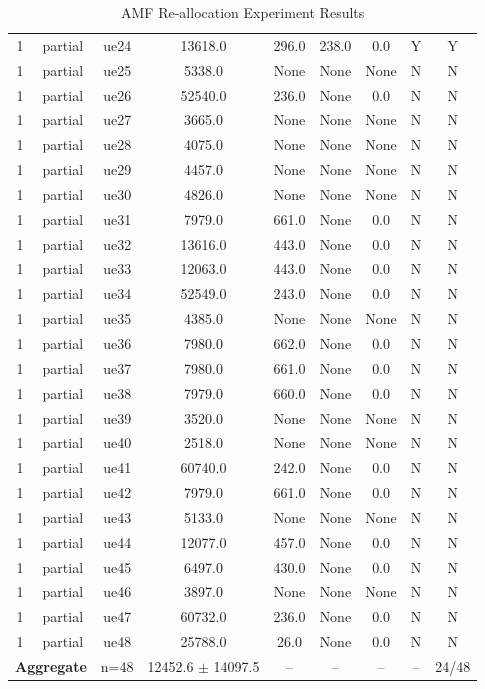 \begin{table}[ht]
\begin{tabular}{|c|c|c|c|c|c|c|c|c|}
1 & partial & ue24 & 13618.0 & 296.0 & 238.0 & 0.0 & Y & Y \\
1 & partial & ue25 & 5338.0 & None & None & None & N & N \\
1 & partial & ue26 & 52540.0 & 236.0 & None & 0.0 & N & N \\
1 & partial & ue27 & 3665.0 & None & None & None & N & N \\
1 & partial & ue28 & 4075.0 & None & None & None & N & N \\
1 & partial & ue29 & 4457.0 & None & None & None & N & N \\
1 & partial & ue30 & 4826.0 & None & None & None & N & N \\
1 & partial & ue31 & 7979.0 & 661.0 & None & 0.0 & N & N \\
1 & partial & ue32 & 13616.0 & 443.0 & None & 0.0 & N & N \\
1 & partial & ue33 & 12063.0 & 443.0 & None & 0.0 & N & N \\
1 & partial & ue34 & 52549.0 & 243.0 & None & 0.0 & N & N \\
1 & partial & ue35 & 4385.0 & None & None & None & N & N \\
1 & partial & ue36 & 7980.0 & 662.0 & None & 0.0 & N & N \\
1 & partial & ue37 & 7980.0 & 661.0 & None & 0.0 & N & N \\
1 & partial & ue38 & 7979.0 & 660.0 & None & 0.0 & N & N \\
1 & partial & ue39 & 3520.0 & None & None & None & N & N \\
1 & partial & ue40 & 2518.0 & None & None & None & N & N \\
1 & partial & ue41 & 60740.0 & 242.0 & None & 0.0 & N & N \\
1 & partial & ue42 & 7979.0 & 661.0 & None & 0.0 & N & N \\
1 & partial & ue43 & 5133.0 & None & None & None & N & N \\
1 & partial & ue44 & 12077.0 & 457.0 & None & 0.0 & N & N \\
1 & partial & ue45 & 6497.0 & 430.0 & None & 0.0 & N & N \\
1 & partial & ue46 & 3897.0 & None & None & None & N & N \\
1 & partial & ue47 & 60732.0 & 236.0 & None & 0.0 & N & N \\
1 & partial & ue48 & 25788.0 & 26.0 & None & 0.0 & N & N \\
\multicolumn{2}{|c|}{\textbf{Aggregate}} & n=48 & 12452.6 $\pm$ 14097.5 & -- & -- & -- & -- & 24/48 \\
\hline
\end{tabular}
\caption{AMF Re-allocation Experiment Results}
\label{tab:amf_realloc}
\end{table}
